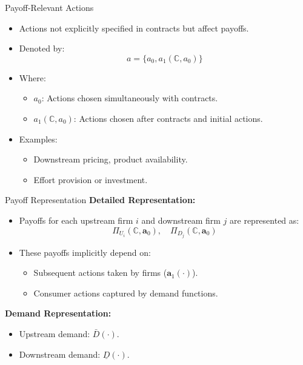 \documentclass[aspectratio=169]{beamer}  %
\begin{document}
\begin{frame}{Payoff-Relevant Actions}
    \begin{itemize}
        \item Actions not explicitly specified in contracts but affect payoffs.
        \item Denoted by:
        \[
        a = \{a_0, a_1(\mathbb{C}, a_0)\}
        \]
        \item Where:
        \begin{itemize}
            \item \(a_0\): Actions chosen simultaneously with contracts.
            \item \(a_1(\mathbb{C}, a_0)\): Actions chosen after contracts and initial actions.
        \end{itemize}
        \item Examples:
        \begin{itemize}
            \item Downstream pricing, product availability.
            \item Effort provision or investment.
        \end{itemize}
    \end{itemize}
\end{frame}

\begin{frame}{Payoff Representation}
    \textbf{Detailed Representation:}
    \begin{itemize}
        \item Payoffs for each upstream firm \(i\) and downstream firm \(j\) are represented as:
        \[
        \Pi_{U_i}(\mathbb{C}, \boldsymbol{a}_0), \quad \Pi_{D_j}(\mathbb{C}, \boldsymbol{a}_0)
        \]
        \item These payoffs implicitly depend on:
        \begin{itemize}
            \item Subsequent actions taken by firms (\(\boldsymbol{a}_1(\cdot)\)).
            \item Consumer actions captured by demand functions.
        \end{itemize}
    \end{itemize}

    \vspace{0.3cm}
    \textbf{Demand Representation:}
    \begin{itemize}
        \item Upstream demand: \(\bar{D}(\cdot)\).
        \item Downstream demand: \(\underline{D}(\cdot)\).
    \end{itemize}
\end{frame}
\end{document}
